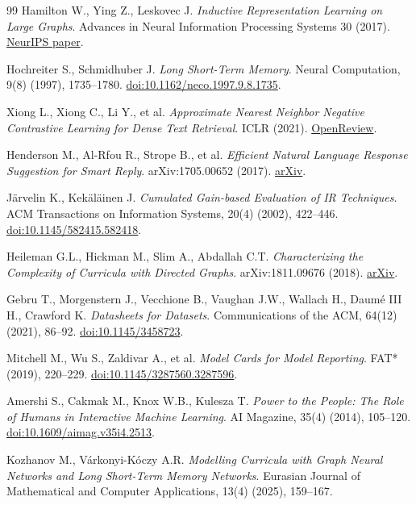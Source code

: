 \documentclass[twoside,11pt]{article}
\begin{document}
\begin{thebibliography}{99}
Hamilton W., Ying Z., Leskovec J.
\emph{Inductive Representation Learning on Large Graphs}.
Advances in Neural Information Processing Systems 30 (2017).
\href{https://proceedings.neurips.cc/paper/2017/hash/5dd9db5e033da9c6fb5ba83c7a7ebea9-Abstract.html}{NeurIPS paper}.

Hochreiter S., Schmidhuber J.
\emph{Long Short-Term Memory}.
Neural Computation, 9(8) (1997), 1735--1780.
\href{https://doi.org/10.1162/neco.1997.9.8.1735}{doi:10.1162/neco.1997.9.8.1735}.

Xiong L., Xiong C., Li Y., et al.
\emph{Approximate Nearest Neighbor Negative Contrastive Learning for Dense Text Retrieval}.
ICLR (2021).
\href{https://openreview.net/forum?id=zeFrfgyZln}{OpenReview}.

Henderson M., Al-Rfou R., Strope B., et al.
\emph{Efficient Natural Language Response Suggestion for Smart Reply}.
arXiv:1705.00652 (2017).
\href{https://arxiv.org/abs/1705.00652}{arXiv}.

J\"arvelin K., Kek\"al\"ainen J.
\emph{Cumulated Gain-based Evaluation of IR Techniques}.
ACM Transactions on Information Systems, 20(4) (2002), 422--446.
\href{https://doi.org/10.1145/582415.582418}{doi:10.1145/582415.582418}.

Heileman G.L., Hickman M., Slim A., Abdallah C.T.
\emph{Characterizing the Complexity of Curricula with Directed Graphs}.
arXiv:1811.09676 (2018).
\href{https://arxiv.org/abs/1811.09676}{arXiv}.

Gebru T., Morgenstern J., Vecchione B., Vaughan J.W., Wallach H., Daum\'e III H., Crawford K.
\emph{Datasheets for Datasets}.
Communications of the ACM, 64(12) (2021), 86--92.
\href{https://doi.org/10.1145/3458723}{doi:10.1145/3458723}.

Mitchell M., Wu S., Zaldivar A., et al.
\emph{Model Cards for Model Reporting}.
FAT* (2019), 220--229.
\href{https://doi.org/10.1145/3287560.3287596}{doi:10.1145/3287560.3287596}.

Amershi S., Cakmak M., Knox W.B., Kulesza T.
\emph{Power to the People: The Role of Humans in Interactive Machine Learning}.
AI Magazine, 35(4) (2014), 105--120.
\href{https://doi.org/10.1609/aimag.v35i4.2513}{doi:10.1609/aimag.v35i4.2513}.

Kozhanov M., V\'arkonyi-K\'oczy A.R.
\emph{Modelling Curricula with Graph Neural Networks and Long Short-Term Memory Networks}.
Eurasian Journal of Mathematical and Computer Applications, 13(4) (2025), 159--167.

\end{thebibliography}
\end{document}
